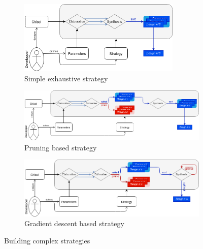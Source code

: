 \clearpage
        \vspace*{\fill}
        \newcommand{\myAlignmentSpace}[0]{\hspace{-2.9cm}}
        \begin{figure}[h!]
            \begin{subfigure}{1.0\textwidth}
                \myAlignmentSpace
                \includegraphics[width=0.85\textwidth]{Figures/DSE-exhaustive}
                \caption{Simple exhaustive strategy\vspace{0.3cm}}
                \label{ch.dse:sec.functional:ssec.complex:fig.complex:sfig.exhaustive}
            \end{subfigure}
            \begin{subfigure}{1.0\textwidth}
                \myAlignmentSpace
                \includegraphics[width=1.36\textwidth]{Figures/DSE-pruning}
                \caption{Pruning based strategy\vspace{0.3cm}}
                \label{ch.dse:sec.functional:ssec.complex:fig.complex:sfig.pruning}
            \end{subfigure}
            \begin{subfigure}{1.0\textwidth}
                \myAlignmentSpace
                \includegraphics[width=1.23\textwidth]{Figures/DSE-gradient}
                \caption{Gradient descent based strategy}
                \label{ch.dse:sec.functional:ssec.complex:fig.complex:sfig.gradient}
            \end{subfigure}
            \caption{Building complex strategies}
            \label{ch.dse:sec.functional:ssec.complex:fig.complex}
        \end{figure}


